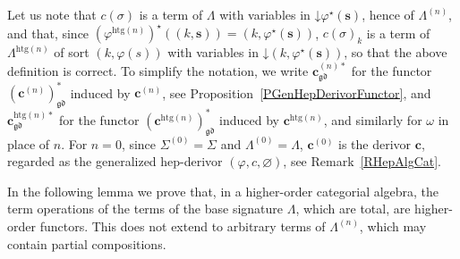 \documentclass[a4paper, reqno]{amsbook}
\newcommand{\vs}[1]{\mathbin{\downarrow}#1}
\newcommand{\gd}{\mathfrak{gd}}              %
\newcommand{\htg}{\mathrm{htg}}                %
\theoremstyle{plain}
\theoremstyle{definition}
\begin{document}
Let us note that $c(\sigma)$ is a term of $\Lambda$ with variables in $\vs{\varphi^{\star}(\mathbf{s})}$, hence of $\Lambda^{(n)}$, and that, since $(\varphi^{\htg(n)})^{\star}((k,\mathbf{s}))=(k,\varphi^{\star}(\mathbf{s}))$, $c(\sigma)_{k}$ is a term of $\Lambda^{\htg(n)}$ of sort $(k,\varphi(s))$ with variables in $\vs{(k,\varphi^{\star}(\mathbf{s}))}$, so that the above definition is correct.
To simplify the notation, we write $\mathbf{c}^{(n)\ast}_{\gd}$ for the functor $(\mathbf{c}^{(n)})^{\ast}_{\gd}$ induced by $\mathbf{c}^{(n)}$, see Proposition~\ref{PGenHepDerivorFunctor}, and $\mathbf{c}^{\htg(n)\ast}_{\gd}$ for the functor $(\mathbf{c}^{\htg(n)})^{\ast}_{\gd}$ induced by $\mathbf{c}^{\htg(n)}$, and similarly for $\omega$ in place of $n$.
For $n=0$, since $\Sigma^{(0)}=\Sigma$ and $\Lambda^{(0)}=\Lambda$, $\mathbf{c}^{(0)}$ is the derivor $\mathbf{c}$, regarded as the generalized hep-derivor $(\varphi,c,\varnothing)$, see Remark~\ref{RHepAlgCat}.

In the following lemma we prove that, in a higher-order categorial algebra, the term operations of the terms of the base signature $\Lambda$, which are total, are higher-order functors.
This does not extend to arbitrary terms of $\Lambda^{(n)}$, which may contain partial compositions.
\end{document}

